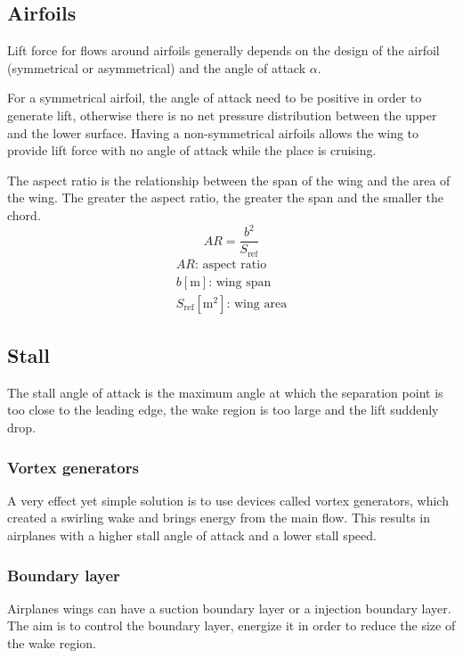 \documentclass[10pt, twocolumn]{article}
\begin{document}
\subsection{Airfoils}
Lift force for flows around airfoils generally depends on the design of the airfoil (symmetrical or asymmetrical) and the angle of attack \(\alpha\).

For a symmetrical airfoil, the angle of attack need to be positive in order to generate lift, otherwise there is no net pressure distribution between the upper and the lower surface. \newline
Having a non-symmetrical airfoils allows the wing to provide lift force with no angle of attack while the place is cruising.

The aspect ratio is the relationship between the span of the wing and the area of the wing.
The greater the aspect ratio, the greater the span and the smaller the chord.
\[
  AR = \frac{b^2}{S_\mathrm{ref}}
\]
\[
  \begin{array}{|l}
    AR \text{: aspect ratio}           \\
    b [\si{\metre}] \text{: wing span} \\
    S_\mathrm{ref} [\si{\metre\squared}] \text{: wing area}
  \end{array}
\]


\subsection{Stall}
The stall angle of attack is the maximum angle at which the separation point is too close to the leading edge, the wake region is too large and the lift suddenly drop.


\subsubsection{Vortex generators}
A very effect yet simple solution is to use devices called vortex generators, which created a swirling wake and brings energy from the main flow.
This results in airplanes with a higher stall angle of attack and a lower stall speed.


\subsubsection{Boundary layer}
Airplanes wings can have a suction boundary layer or a injection boundary layer.
The aim is to control the boundary layer, energize it in order to reduce the size of the wake region.
\end{document}
